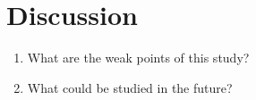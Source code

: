 \documentclass[english,12pt,a4paper,pdftex]{article}
\begin{document}

\section{Discussion}

\begin{enumerate}
\item What are the weak points of this study?
\item What could be studied in the future?
\end{enumerate}

\end{document}
